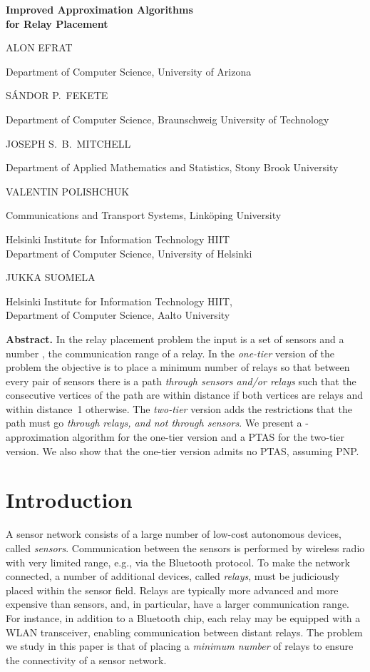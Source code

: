 \documentclass[11pt,a4paper]{article}
\theoremstyle{definition}
\theoremstyle{remark}
\newenvironment{myabstract}
               {\list{}{\listparindent 1.5em\itemindent    \listparindent
                        \leftmargin    0cm
                        \rightmargin   0cm
                        \parsep        0pt}\item\relax}
               {\endlist}
\newenvironment{mycover}
               {\list{}{\listparindent 0pt
                        \itemindent    \listparindent
                        \leftmargin    0cm
                        \rightmargin   0cm
                        \parsep        0pt}\raggedright
                \item\relax}
               {\endlist}
\newcommand{\myauthor}[1]{#1\par\smallskip}
\newcommand{\myaff}[1]{{\small #1\par}\bigskip}
\begin{document}
\mbox{}
\begin{mycover}
{\huge \bfseries Improved Approximation Algorithms \\ for Relay Placement \par}

\bigskip
\bigskip
\myauthor{ALON EFRAT}
\myaff{Department of Computer Science, University of Arizona}

\myauthor{S\'ANDOR P.\ FEKETE}
\myaff{Department of Computer Science, Braunschweig University of Technology}

\myauthor{JOSEPH S.\ B.\ MITCHELL}
\myaff{Department of Applied Mathematics and Statistics, Stony Brook University}

\myauthor{VALENTIN POLISHCHUK}
\myaff{Communications and Transport Systems, Link\"oping University
    \par\smallskip
    Helsinki Institute for Information Technology HIIT\\
    Department of Computer Science, University of Helsinki}

\myauthor{JUKKA SUOMELA}
\myaff{Helsinki Institute for Information Technology HIIT, \\
    Department of Computer Science, Aalto University}
\end{mycover}

\bigskip
\begin{myabstract}
\noindent\textbf{Abstract.}
In the relay placement problem the input is a set of sensors and a number , the communication range of a relay.  In the \emph{one-tier} version of the problem the objective is to place a minimum number of relays so that between every pair of sensors there is a path \emph{through sensors and/or relays} such that the consecutive vertices of the path are within distance  if both vertices are relays and within distance~1 otherwise.  The \emph{two-tier} version adds the restrictions that the path must go \emph{through relays, and not through sensors}.  We present a -approximation algorithm for the one-tier version and a PTAS for the two-tier version.  We also show that the one-tier version admits no PTAS, assuming PNP.
\end{myabstract}
\thispagestyle{empty}
\setcounter{page}{0}
\newpage



\section{Introduction}

A sensor network consists of a large number of low-cost autonomous devices, called \emph{sensors}. Communication between the sensors is performed by wireless radio with very limited range, e.g., via the Bluetooth protocol. To make the network connected, a number of additional devices, called \emph{relays}, must be judiciously placed within the sensor field.  Relays are typically more advanced and more expensive than sensors, and, in particular, have a larger communication range.  For instance, in addition to a Bluetooth chip, each relay may be equipped with a WLAN transceiver, enabling communication between distant relays.  The problem we study in this paper is that of placing a \emph{minimum number} of relays to ensure the connectivity of a sensor network.
\end{document}
